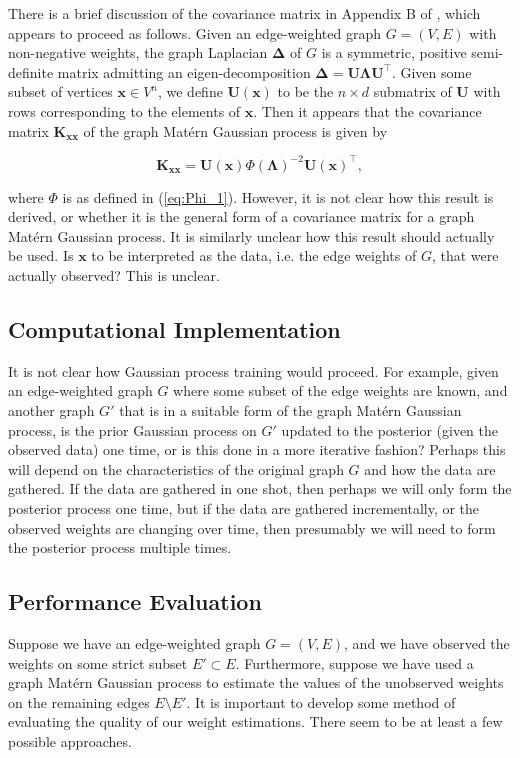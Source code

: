 There is a brief discussion of the covariance matrix in Appendix B of \cite{pmlr-v130-borovitskiy21a}, which appears to proceed as follows. Given an edge-weighted graph $G = (V, E)$ with non-negative weights, the graph Laplacian $\bm \Delta$ of $G$ is a symmetric, positive semi-definite matrix admitting an eigen-decomposition $\bm \Delta = \mathbf U \bm \Lambda \mathbf U^\intercal$. Given some subset of vertices $\bm x \in V^n$, we define $\mathbf U(\bm x)$ to be the $n \times d$ submatrix of $\mathbf U$ with rows corresponding to the elements of $\bm x$. Then it appears that the covariance matrix $\mathbf K_{\bm {xx}}$ of the graph Mat\'{e}rn Gaussian process is given by

\[
    \mathbf K_{\bm{xx}} = \mathbf U(\bm x)\Phi(\bm \Lambda)^{-2} \mathbf U(\bm x)^\intercal,
\]

where $\Phi$ is as defined in (\ref{eq:Phi_1}). However, it is not clear how this result is derived, or whether it is the general form of a covariance matrix for a graph Mat\'{e}rn Gaussian process. It is similarly unclear how this result should actually be used. Is $\bm x$ to be interpreted as the data, i.e. the edge weights of $G$, that were actually observed? This is unclear.

\subsection{Computational Implementation}\label{sec:comp_implem}

It is not clear how Gaussian process training would proceed. For example, given an edge-weighted graph $G$ where some subset of the edge weights are known, and another graph $G'$ that is in a suitable form of the graph Mat\'{e}rn Gaussian process, is the prior Gaussian process on $G'$ updated to the posterior (given the observed data) one time, or is this done in a more iterative fashion? Perhaps this will depend on the characteristics of the original graph $G$ and how the data are gathered. If the data are gathered in one shot, then perhaps we will only form the posterior process one time, but if the data are gathered incrementally, or the observed weights are changing over time, then presumably we will need to form the posterior process multiple times.

\subsection{Performance Evaluation}

Suppose we have an edge-weighted graph $G = (V, E)$, and we have observed the weights on some strict subset $E' \subset E$. Furthermore, suppose we have used a graph Mat\'{e}rn Gaussian process to estimate the values of the unobserved weights on the remaining edges $E \setminus E'$. It is important to develop some method of evaluating the quality of our weight estimations. There seem to be at least a few possible approaches.

